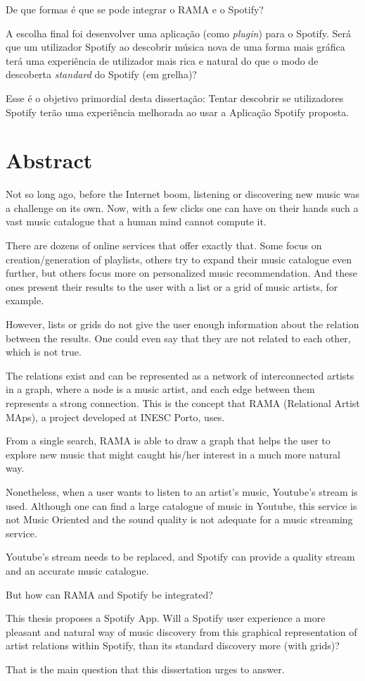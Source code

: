 De que formas é que se pode integrar o RAMA e o Spotify?

A escolha final foi desenvolver uma aplicação (como \emph{plugin}) para o Spotify.
Será que um utilizador Spotify ao descobrir música nova de uma forma mais gráfica terá uma experiência de utilizador mais rica e natural do que o modo de descoberta \emph{standard} do Spotify (em grelha)?

Esse é o objetivo primordial desta dissertação: Tentar descobrir se utilizadores Spotify terão uma experiência melhorada ao usar a Aplicação Spotify proposta.

\chapter*{Abstract}

Not so long ago, before the Internet boom, listening or discovering new music was a challenge on its own.
Now, with a few clicks one can have on their hands such a vast music catalogue that a human mind cannot compute it.

There are dozens of online services that offer  exactly that.
Some focus on creation/generation of playlists, others try to expand their music catalogue even further, but others focus more on personalized music recommendation.
And these ones present their results to the user with a list or a grid of music artists, for example.

However, lists or grids do not give the user enough information about the relation between the results.
One could even say that they are not related to each other, which is not true.

The relations exist and can be represented as a network of interconnected artists in a graph, where a node is a music artist, and each edge between them represents a strong connection.
This is the concept that RAMA (Relational Artist MAps), a project developed at INESC Porto, uses.

From a single search, RAMA is able to draw a graph that helps the user to explore new music that might caught his/her interest in a much more natural way.

Nonetheless, when a user wants to listen to an artist's music, Youtube's stream is used.
Although one can find a large catalogue of music in Youtube, this service is not Music Oriented and the sound quality is not adequate for a music streaming service.

Youtube's stream needs to be replaced, and Spotify can provide a quality stream and an accurate music catalogue.

But how can RAMA and Spotify be integrated?

This thesis proposes a Spotify App.
Will a Spotify user experience a more pleasant and natural way of music discovery from this graphical representation of artist relations within Spotify, than its standard discovery more (with grids)?

That is the main question that this dissertation urges to answer.